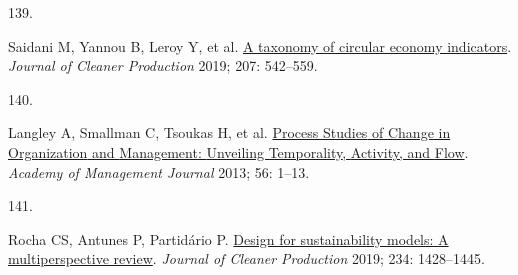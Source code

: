 \documentclass[
  12pt,
  a4paperpaper,
  onecolumn]{article}
\newlength{\cslhangindent}
\newlength{\csllabelwidth}
\newlength{\cslentryspacingunit} %
\newenvironment{CSLReferences}[2] %
 {%
  \setlength{\parindent}{0pt}
  \ifodd #1
  \let\oldpar\par
  \def\par{\hangindent=\cslhangindent\oldpar}
  \fi
  \setlength{\parskip}{#2\cslentryspacingunit}
 }%
 {}
\newcommand{\CSLLeftMargin}[1]{\parbox[t]{\csllabelwidth}{#1}}
\newcommand{\CSLRightInline}[1]{\parbox[t]{\linewidth - \csllabelwidth}{#1}\break}
\begin{document}
\begin{CSLReferences}{0}{0}
\leavevmode{}%
\CSLLeftMargin{139. }%
\CSLRightInline{Saidani M, Yannou B, Leroy Y, et al.
\href{https://doi.org/10.1016/j.jclepro.2018.10.014}{A taxonomy of
circular economy indicators}. \emph{Journal of Cleaner Production} 2019;
207: 542--559.}

\leavevmode{}%
\CSLLeftMargin{140. }%
\CSLRightInline{Langley A, Smallman C, Tsoukas H, et al.
\href{https://doi.org/10.5465/amj.2013.4001}{Process {Studies} of
{Change} in {Organization} and {Management}: {Unveiling Temporality},
{Activity}, and {Flow}}. \emph{Academy of Management Journal} 2013; 56:
1--13.}

\leavevmode{}%
\CSLLeftMargin{141. }%
\CSLRightInline{Rocha CS, Antunes P, Partidário P.
\href{https://doi.org/10.1016/j.jclepro.2019.06.108}{Design for
sustainability models: {A} multiperspective review}. \emph{Journal of
Cleaner Production} 2019; 234: 1428--1445.}

\end{CSLReferences}
\end{document}
